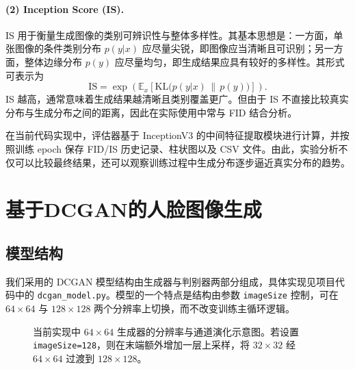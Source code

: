 \documentclass[12pt, a4paper, UTF8]{ctexart}
\begin{document}
\paragraph{(2) Inception Score (IS).}
IS 用于衡量生成图像的类别可辨识性与整体多样性\cite{salimans2016improved}。其基本思想是：一方面，单张图像的条件类别分布 $p(y|x)$ 应尽量尖锐，即图像应当清晰且可识别；另一方面，整体边缘分布 $p(y)$ 应尽量均匀，即生成结果应具有较好的多样性。其形式可表示为
\begin{equation}
\mathrm{IS} = \exp\left(
\mathbb{E}_{x}\left[
\mathrm{KL}\big(p(y|x)\,\|\,p(y)\big)
\right]
\right).
\end{equation}
IS 越高，通常意味着生成结果越清晰且类别覆盖更广。但由于 IS 不直接比较真实分布与生成分布之间的距离，因此在实际使用中常与 FID 结合分析。

在当前代码实现中，评估器基于 InceptionV3 的中间特征提取模块进行计算，并按照训练 epoch 保存 FID/IS 历史记录、柱状图以及 CSV 文件。由此，实验分析不仅可以比较最终结果，还可以观察训练过程中生成分布逐步逼近真实分布的趋势。

\section{基于DCGAN的人脸图像生成}
\subsection{模型结构}

我们采用的 DCGAN 模型结构由生成器与判别器两部分组成，具体实现见项目代码中的 \verb|dcgan_model.py|。模型的一个特点是结构由参数 \verb|imageSize| 控制，可在 $64\times64$ 与 $128\times128$ 两个分辨率上切换，而不改变训练主循环逻辑。

\begin{figure}[H]
\centering
{}
\caption{当前实现中 $64\times64$ 生成器的分辨率与通道演化示意图。若设置 \texttt{imageSize=128}，则在末端额外增加一层上采样，将 $32\times32$ 经 $64\times64$ 过渡到 $128\times128$。}
\end{figure}
\end{document}
